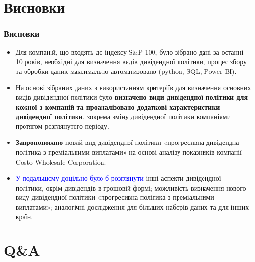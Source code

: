 \documentclass[aspectratio=169]{beamer}
\begin{document}
\section{Висновки}

\begin{frame}
\frametitle{Висновки}
\begin{itemize}
\item Для компаній, що
входять до індексу S\&P 100, було зібрано дані за останні 10
років, необхідні для визначення видів дивідендної політики, процес збору та обробки даних максимально автоматизовано (python, SQL, Power BI).
\smallskip
\item На основі зібраних даних з використанням критеріїв для визначення основних видів дивідендної політики було \alert {\textbf{визначено види дивідендної політики для кожної з компаній та проаналізовано додаткові характеристики дивідендної політики}}, зокрема зміну дивідендної політики компаніями протягом розглянутого періоду.
\smallskip
\item \alert {\textbf{Запропоновано}} новий вид дивідендної політики \alert {«прогресивна дивідендна політика з преміальними виплатами»} на основі аналізу показників компанії Costo Wholesale Corporation. 
\smallskip
{}
\item \textcolor{blue} {У подальшому доцільно було б розглянути} інші аспекти дивідендної політики, окрім дивідендів в грошовій формі; можливість визначення нового виду дивідендної політики «прогресивна політика з преміальними виплатами»; аналогічні дослідження для більших наборів даних та для інших країн.
\bigskip
\end{itemize}
\end{frame}

\section{Q\&A}
\end{document}
